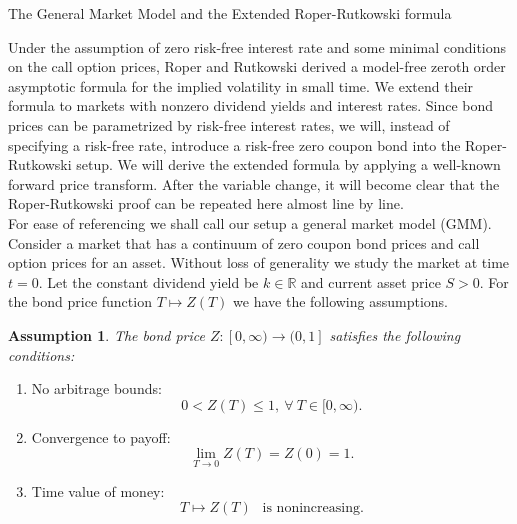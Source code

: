 \documentclass[unknownkeysallowed, compress]{beamer}
\theoremstyle{plain}
\newtheorem{assumption}[theorem]{\textbf{Assumption}}
\begin{document}
\begin{frame}[allowframebreaks]{The General Market Model and the Extended Roper-Rutkowski formula}
\noindent
\par Under the assumption of zero risk-free interest rate and some minimal conditions on the
call option prices, Roper and Rutkowski derived a model-free zeroth order asymptotic formula for the implied volatility in small time. We extend their formula to markets with nonzero dividend yields and interest rates. Since bond prices can be parametrized by risk-free interest rates, we will,
instead of specifying a risk-free rate, introduce a risk-free zero coupon bond into the Roper-Rutkowski setup. We will derive the extended formula by applying a well-known forward
price transform. After the variable change, it will become clear that the Roper-Rutkowski
proof can be repeated here almost line by line.\\ %
For ease of referencing we shall call our setup a general market model (GMM). Consider
a market that has a continuum of zero coupon bond prices and call option prices for an asset.
Without loss of generality we study the market at time $t = 0$.  Let the constant dividend
yield be $k\in\mathbb{R}$ and current asset price $S > 0$. For the bond price function $T \mapsto Z(T)$ we
have the following assumptions.
\begin{assumption}\cite[pg.~10]{guo2011small}\label{as1}
The bond price $Z:[0,\infty)\rightarrow (0,1]$ satisfies the following conditions:
\end{assumption}
\begin{enumerate}
\item[(Z1)] No arbitrage bounds:
\begin{equation}\label{neww13}
0<Z(T)\leq 1,~\forall~ T\in [0,\infty).
\end{equation}
\item[(Z2)] Convergence to payoff:
\begin{equation}\label{neww14}
\lim_{T\rightarrow 0}Z(T) = Z(0) = 1.
\end{equation}
\item[(Z3)] Time value of money:
\begin{equation}\label{neww15}
T\mapsto Z(T)~~\mbox{   is nonincreasing}. 

\end{equation}
\end{enumerate}
\end{frame}
\end{document}
